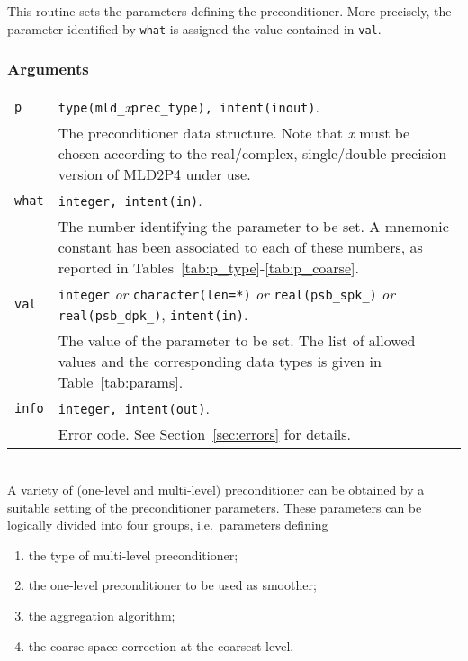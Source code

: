 \noindent
This routine sets the parameters defining the preconditioner. More
precisely, the parameter identified by \verb|what| is assigned the value
contained in \verb|val|.

\subsubsection*{Arguments}

\begin{tabular}{p{1.2cm}p{11.5cm}}
\verb|p|      & \verb|type(mld_|\emph{x}\verb|prec_type), intent(inout)|.\\
              & The preconditioner data structure. Note that \emph{x} must
                be chosen according to the real/complex, single/double precision
                 version of MLD2P4 under use.\\
\verb|what|   & \verb|integer, intent(in)|. \\
              & The number identifying the parameter to be set.
                A mnemonic constant has been associated to each of these
                numbers, as reported in Tables~\ref{tab:p_type}-\ref{tab:p_coarse}.\\
\verb|val |   & \verb|integer| \emph{or} \verb|character(len=*)| \emph{or}
                \verb|real(psb_spk_)| \emph{or} \verb|real(psb_dpk_)|,
                \verb|intent(in)|.\\
              & The value of the parameter to be set. The list of allowed
                values and the corresponding data types is given in
                Table~\ref{tab:params}.\\
\verb|info|   & \verb|integer, intent(out)|.\\
              & Error code. See Section~\ref{sec:errors} for details.\\
\end{tabular}

\ \\
A variety of (one-level and multi-level) preconditioner can be obtained
by a suitable setting of the preconditioner parameters. These parameters
can be logically divided into four groups, i.e.\ parameters defining
\begin{enumerate}
	\item the type of multi-level preconditioner;
	\item the one-level preconditioner to be used as smoother;
	\item the aggregation algorithm;
	\item the coarse-space correction at the coarsest level.
\end{enumerate}

